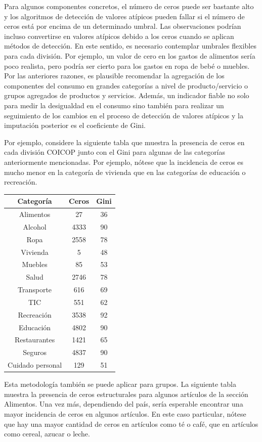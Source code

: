 \documentclass[
  10pt,
  spanish,
]{book}
\begin{document}
Para algunos componentes concretos, el número de ceros puede ser bastante alto y los algoritmos de detección de valores atípicos pueden fallar si el número de ceros está por encima de un determinado umbral. Las observaciones podrían incluso convertirse en valores atípicos debido a los ceros cuando se aplican métodos de detección. En este sentido, es necesario contemplar umbrales flexibles para cada división. Por ejemplo, un valor de cero en los gastos de alimentos sería poco realista, pero podría ser cierto para los gastos en ropa de bebé o muebles. Por las anteriores razones, es plausible recomendar la agregación de los componentes del consumo en grandes categorías a nivel de producto/servicio o grupos agregados de productos y servicios. Además, un indicador fiable no solo para medir la desigualdad en el consumo sino también para realizar un seguimiento de los cambios en el proceso de detección de valores atípicos y la imputación posterior es el coeficiente de Gini.

Por ejemplo, considere la siguiente tabla que muestra la presencia de ceros en cada división COICOP junto con el Gini para algunas de las categorías anteriormente mencionadas. Por ejemplo, nótese que la incidencia de ceros es mucho menor en la categoría de vivienda que en las categorías de educación o recreación.

\begin{longtable}[]{@{}ccc@{}}
\toprule
Categoría & Ceros & Gini \\
\midrule
\endhead
Alimentos & 27 & 36 \\
Alcohol & 4333 & 90 \\
Ropa & 2558 & 78 \\
Vivienda & 5 & 48 \\
Muebles & 85 & 53 \\
Salud & 2746 & 78 \\
Transporte & 616 & 69 \\
TIC & 551 & 62 \\
Recreación & 3538 & 92 \\
Educación & 4802 & 90 \\
Restaurantes & 1421 & 65 \\
Seguros & 4837 & 90 \\
Cuidado personal & 129 & 51 \\
\bottomrule
\end{longtable}

Esta metodología también se puede aplicar para grupos. La siguiente tabla muestra la presencia de ceros estructurales para algunos artículos de la sección Alimentos. Una vez más, dependiendo del país, sería esperable encontrar una mayor incidencia de ceros en algunos artículos. En este caso particular, nótese que hay una mayor cantidad de ceros en artículos como té o café, que en artículos como cereal, azucar o leche.
\end{document}
